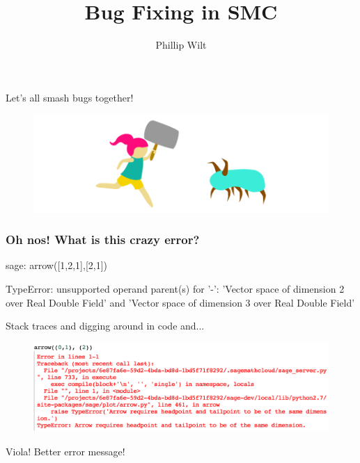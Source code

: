 \documentclass[xcolor=dvipsnames]{beamer}
\title{Bug Fixing in SMC}
\author{Phillip Wilt}\institute{University of Washington}
\begin{document}
\begin{frame}

\maketitle

\end{frame}

\begin{frame}

\centerline{Let's all smash bugs together!}

\begin{figure}[H]
    \centering
        \includegraphics[width=1\textwidth]{bug}
\end{figure}

\end{frame}

\begin{frame}

\frametitle{Oh nos! What is this crazy error?}

sage: arrow([1,2,1],[2,1])

\vspace{3mm}

TypeError: unsupported operand parent(s) for '-': 'Vector space of dimension 2 over Real Double Field' and 'Vector space of dimension 3 over Real Double Field'

\end{frame}

\begin{frame}

\centerline{Stack traces and digging around in code and...}

\begin{figure}[H]
    \centering
        \includegraphics[width=.80\textwidth]{arrowbug}
\end{figure}

\centerline{Viola! Better error message!}

\end{frame}
\end{document}
